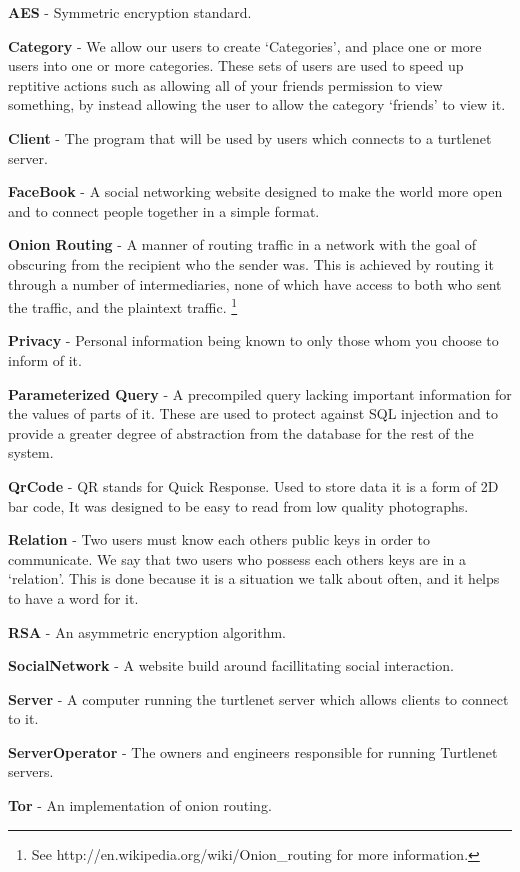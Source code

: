 \textbf{AES} - Symmetric encryption standard.

\textbf{Category} - We allow our users to create `Categories', and place one or 
more users into one or more categories. These sets of users are used to speed up 
reptitive actions such as allowing all of your friends permission to view 
something, by instead allowing the user to allow the category `friends' to view 
it.

\textbf{Client} - The program that will be used by users which connects to a 
turtlenet server.

\textbf{FaceBook} - A social networking website designed to make the world more 
open and to connect people together in a simple format.

\textbf{Onion Routing} - A manner of routing traffic in a network with the goal 
of obscuring from the recipient who the sender was. This is achieved by routing 
it through a number of intermediaries, none of which have access to both who sent 
the traffic, and the plaintext traffic.
\footnote{See http://en.wikipedia.org/wiki/Onion\_routing for more information.}

\textbf{Privacy} - Personal information being known to only those whom you choose 
to inform of it.

\textbf{Parameterized Query} - A precompiled query lacking important information 
for the values of parts of it. These are used to protect against SQL injection 
and to provide a greater degree of abstraction from the database for the rest of 
the system.

\textbf{QrCode} - QR stands for Quick Response.  Used to store data it is a form 
of 2D bar code, It was designed to be easy to read from low quality photographs.

\textbf{Relation} - Two users must know each others public keys in order to 
communicate. We say that two users who possess each others keys are in a 
`relation'. This is done because it is a situation we talk about often, and it 
helps to have a word for it.

\textbf{RSA} - An asymmetric encryption algorithm.

\textbf{SocialNetwork} - A website build around facillitating social
interaction.

\textbf{Server} - A computer running the turtlenet server which allows clients
to connect to it.

\textbf{ServerOperator} - The owners and engineers responsible for running 
Turtlenet servers.

\textbf{Tor} - An implementation of onion routing.
